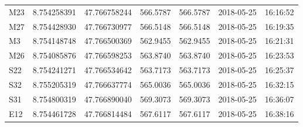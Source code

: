 \begin{table}[!ht]
\begin{tabular}{lllllll}
M23     & 8.754258391 & 47.766758244 & 566.5787 & 566.5787 & 2018-05-25 & 16:16:52 \\
M27     & 8.754428930 & 47.766730977 & 566.5148 & 566.5148 & 2018-05-25 & 16:19:35 \\
M3      & 8.754148748 & 47.766500369 & 562.9455 & 562.9455 & 2018-05-25 & 16:21:31 \\
M26     & 8.754085876 & 47.766598253 & 563.8740 & 563.8740 & 2018-05-25 & 16:23:53 \\
S22     & 8.754241271 & 47.766534642 & 563.7173 & 563.7173 & 2018-05-25 & 16:25:37 \\
S32     & 8.755205319 & 47.766637774 & 565.0036 & 565.0036 & 2018-05-25 & 16:32:15 \\
S31     & 8.754800319 & 47.766890040 & 569.3073 & 569.3073 & 2018-05-25 & 16:36:07 \\
E12     & 8.754461728 & 47.766814484 & 567.6117 & 567.6117 & 2018-05-25 & 16:38:16 \\
\bottomrule
\end{tabular}
\end{table}

